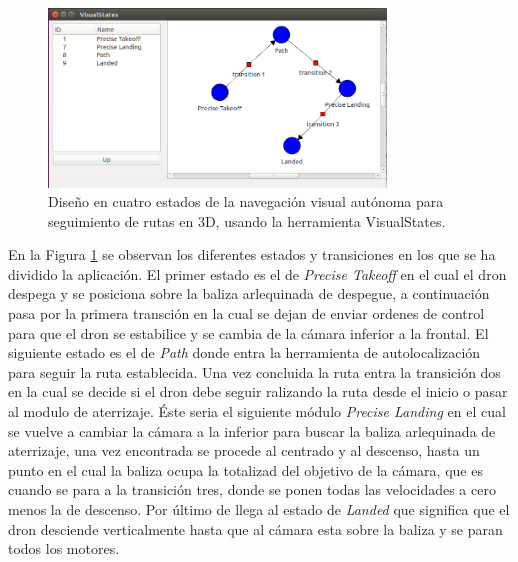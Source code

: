 \begin{figure}[H]
	\begin{center}
		\includegraphics[width=0.8\textwidth]{imag/IMG60.png}
				\caption{Diseño en cuatro estados de la navegación visual autónoma para seguimiento de rutas en 3D, usando la herramienta VisualStates.}
		\label{fig:Esquema VisualStates.}	
	\end{center}
\end{figure}

\hspace{1cm} En la Figura \ref{fig:Esquema VisualStates.} se observan los diferentes estados y transiciones en los que se ha dividido la aplicación. El primer estado es el de \textit{Precise Takeoff} en el cual el dron despega y se posiciona sobre la baliza arlequinada de despegue, a continuación pasa por la primera transción en la cual se dejan de enviar ordenes de control para que el dron se estabilice y se cambia de la cámara inferior a la frontal. El siguiente estado es el de \textit{Path} donde entra la herramienta de autolocalización para seguir la ruta establecida. Una vez concluida la ruta entra la transición dos en la cual se decide si el dron debe seguir ralizando la ruta desde el inicio o pasar al modulo de aterrizaje. Éste seria el siguiente módulo \textit{Precise Landing} en el cual se vuelve a cambiar la cámara a la inferior para buscar la baliza arlequinada de aterrizaje, una vez encontrada se procede al centrado y al descenso, hasta un punto en el cual la baliza ocupa la totalizad del objetivo de la cámara, que es cuando se para a la transición tres, donde se ponen todas las velocidades a cero menos la de descenso. Por último de llega al estado de \textit{Landed} que significa que el dron desciende verticalmente hasta que al cámara esta sobre la baliza y se paran todos los motores. 

